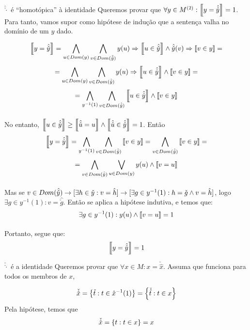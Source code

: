     \begin{lemma}{$\hat{\check\cdot}$ é ``homotópica'' à identidade}
        Queremos provar que $\forall y\in M^{(2)}: \left\llbracket y = \hat{\check{y}}\right\rrbracket = 1$. Para tanto, 
        vamos supor como hipótese de indução que a sentença valha no domínio de um $y$ dado.

        $$
            \left\llbracket y = \hat{\check{y}}\right\rrbracket =\bigwedge_{u\in Dom(y)}\bigwedge_{v\in Dom(\hat{\check{y}})}y(u)\Rightarrow\left\llbracket u \in \hat{\check{y}}\right\rrbracket\land\hat{\check{y}}(v)\Rightarrow\left\llbracket v \in y\right\rrbracket = 
        $$
        $$
            =\bigwedge_{u\in Dom(y)}\bigwedge_{v\in Dom(\hat{\check{y}})}y(u)\Rightarrow\left\llbracket u \in \hat{\check{y}}\right\rrbracket\land\left\llbracket v \in y\right\rrbracket = 
        $$
        $$
            =\bigwedge_{y^{-1}(1)}\bigwedge_{v\in Dom(\hat{\check{y}})}\left\llbracket u \in \hat{\check{y}}\right\rrbracket\land\left\llbracket v \in y\right\rrbracket
        $$
        \paragraph{}
            No entanto, $\left\llbracket u \in \hat{\check{y}}\right\rrbracket\geq\left\llbracket\hat{\check{u}} = u\right\rrbracket\land\left\llbracket\hat{\check{u}} \in \hat{\check{y}}\right\rrbracket = 1$. Então
        $$
            \left\llbracket y = \hat{\check{y}}\right\rrbracket=\bigwedge_{y^{-1}(1)}\bigwedge_{v\in Dom(\hat{\check{y}})}\left\llbracket v \in y\right\rrbracket= \bigwedge_{v\in Dom(\hat{\check{y}})}\left\llbracket v \in y\right\rrbracket=
        $$
        $$
            = \bigwedge_{v\in Dom(\hat{\check{y}})}\bigvee_{u\in Dom(y)} y(u)\land\left\llbracket v = u\right\rrbracket
        $$
        \paragraph{}
            Mas se $v\in Dom(\hat{\check{y}}) \rightarrow [\exists h\in \check y : v = \hat h]\rightarrow [\exists g\in y^{-1}(1) : h = \check{g} \land v = \hat h]$, logo
            $\exists g\in y^{-1}(1) : v = \hat{\check{g}}$. Então se aplica a hipótese indutiva, e temos que:
        $$ \exists g\in y^{-1}(1): y(u)\land\left\llbracket v = u\right\rrbracket = 1$$
        \paragraph{}
            Portanto, segue que:
        $$\left\llbracket y = \hat{\check{y}}\right\rrbracket = 1$$
        \eop
    \end{lemma}
    \begin{lemma}{$\check{\hat{\cdot}}$ é a identidade}
        Queremos provar que $\forall x\in M: x = \check{\hat{x}}$. Assuma que funciona para todos os membros de $x$,

        $$\check{\hat x} = \SET{\check{t} : t\in \hat{x}^{-1}(1)} = \SET{\check{\hat t} : t \in x}$$
        Pela hipótese, temos que 
        $$\check{\hat x} = \SET{t : t \in x} = x$$\eop
    \end{lemma}
